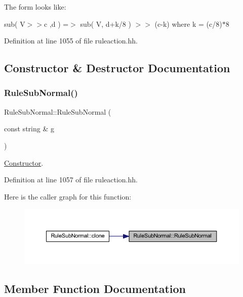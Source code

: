 The form looks like\+:
\begin{DoxyItemize}
\item {\ttfamily sub( V$>$$>$c ,d ) =$>$ sub( V, d+k/8 ) $>$$>$ (c-\/k) where k = (c/8)$\ast$8} 
\end{DoxyItemize}

Definition at line 1055 of file ruleaction.\+hh.



\subsection{Constructor \& Destructor Documentation}
\mbox{\label{class_rule_sub_normal_aaabb659e2cbb8be6923f8b6e7b379522}} 
\subsubsection{\texorpdfstring{RuleSubNormal()}{RuleSubNormal()}}
{\footnotesize\ttfamily Rule\+Sub\+Normal\+::\+Rule\+Sub\+Normal (\begin{DoxyParamCaption}\item[{const string \&}]{g }\end{DoxyParamCaption})\hspace{0.3cm}{\ttfamily [inline]}}



\mbox{\hyperlink{class_constructor}{Constructor}}. 



Definition at line 1057 of file ruleaction.\+hh.

Here is the caller graph for this function\+:
\nopagebreak
\begin{figure}[H]
\begin{center}
\leavevmode
\includegraphics[width=350pt]{class_rule_sub_normal_aaabb659e2cbb8be6923f8b6e7b379522_icgraph}
\end{center}
\end{figure}


\subsection{Member Function Documentation}
\mbox{\label{class_rule_sub_normal_a257e214dcabe37990f299a02912c75c2}} 
